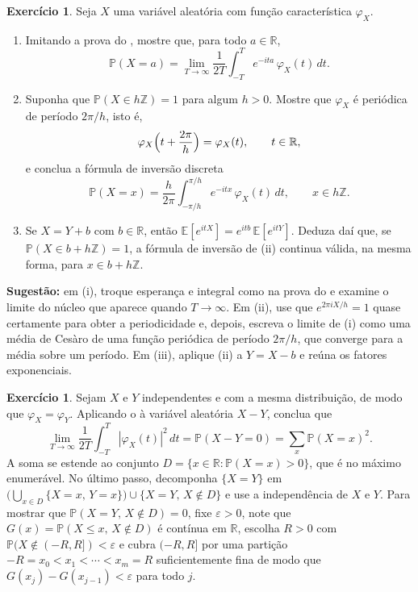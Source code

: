 \documentclass[12pt,portuguese]{article}
\theoremstyle{definition}
\theoremstyle{plainexercise}
\theoremstyle{starredexercise}
\newtheorem{starredexercise}[exercise]{Exercício}
\theoremstyle{definition}
\begin{document}
\begin{starredexercise}\label{exercise:massa-pontual}
Seja $X$ uma variável aleatória com função característica $\varphi_X$.
\begin{enumerate}
\item[(i)] Imitando a prova do , mostre que, para todo
$a\in\mathbb{R}$,
\[
\mathbb{P}(X=a)
=\lim_{T\to\infty}\frac{1}{2T}\int_{-T}^{T}e^{-ita}\,\varphi_X(t)\,dt .
\]

\item[(ii)] Suponha que $\mathbb{P}(X\in h\mathbb{Z})=1$ para algum $h>0$.
Mostre que $\varphi_X$ é periódica de período $2\pi/h$, isto é,
\[
\varphi_X\Bigl(t+\frac{2\pi}{h}\Bigr) = \varphi_X(t), \qquad t\in\mathbb{R},
\]
e conclua a fórmula de inversão discreta
\[
\mathbb{P}(X=x) = \frac{h}{2\pi}\int_{-\pi/h}^{\pi/h}e^{-itx}\,\varphi_X(t)\,dt,
\qquad x\in h\mathbb{Z}.
\]

\item[(iii)] Se $X=Y+b$ com $b\in\mathbb{R}$, então
$\mathbb{E}[e^{itX}] = e^{itb}\,\mathbb{E}[e^{itY}]$. Deduza daí que, se
$\mathbb{P}(X\in b+h\mathbb{Z})=1$, a fórmula de inversão de (ii) continua
válida, na mesma forma, para $x\in b+h\mathbb{Z}$.
\end{enumerate}

\noindent\textbf{Sugestão:} em (i), troque esperança e integral como na prova do
 e examine o limite do núcleo que aparece quando
$T\to\infty$. Em (ii), use que $e^{2\pi iX/h}=1$ quase certamente para obter a
periodicidade e, depois, escreva o limite de (i) como uma média de Cesàro de uma
função periódica de período $2\pi/h$, que converge para a média sobre um
período. Em (iii), aplique (ii) a $Y=X-b$ e reúna os fatores exponenciais.
\end{starredexercise}

\begin{starredexercise}\label{exercise:media-quadrado}
Sejam $X$ e $Y$ independentes e com a mesma distribuição, de modo que
$\varphi_X=\varphi_Y$.
Aplicando o  à variável aleatória $X-Y$, conclua que
\[
\lim_{T\to\infty}\frac{1}{2T}\int_{-T}^{T}|\varphi_X(t)|^2\,dt
= \mathbb{P}(X-Y=0)
= \sum_{x}\mathbb{P}(X=x)^2 .
\]
A soma se estende ao conjunto $D=\{x\in\mathbb{R}:\mathbb{P}(X=x)>0\}$, que é no
máximo enumerável. No último passo, decomponha $\{X=Y\}$ em
$\bigl(\bigcup_{x\in D}\{X=x,\,Y=x\}\bigr)\cup\{X=Y,\,X\notin D\}$ e use a
independência de $X$ e $Y$. Para mostrar que $\mathbb{P}(X=Y,\,X\notin D)=0$,
fixe $\varepsilon>0$, note que $G(x)=\mathbb{P}(X\leqslant x,\,X\notin D)$ é
contínua em $\mathbb{R}$, escolha $R>0$ com $\mathbb{P}(X\notin(-R,R])<\varepsilon$ e
cubra $(-R,R]$ por uma partição $-R=x_0<x_1<\cdots<x_m=R$ suficientemente fina
de modo que $G(x_j)-G(x_{j-1})<\varepsilon$ para todo $j$.
\end{starredexercise}
\end{document}

